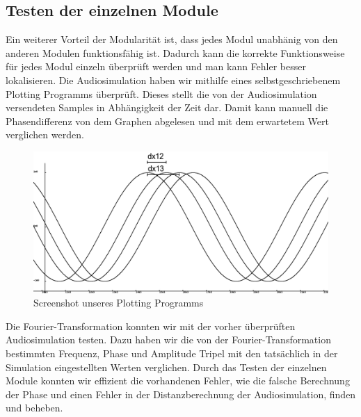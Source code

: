 \subsection{Testen der einzelnen Module}
Ein weiterer Vorteil der Modularität ist, dass jedes Modul unabhänig von den anderen Modulen funktionsfähig ist. Dadurch kann die korrekte Funktionsweise für jedes Modul einzeln überprüft werden und man kann Fehler besser lokalisieren.
Die Audiosimulation haben wir mithilfe eines selbstgeschriebenem Plotting Programms überprüft. Dieses stellt die von der Audiosimulation versendeten Samples in Abhängigkeit der Zeit dar. Damit kann manuell die Phasendifferenz von dem Graphen abgelesen und mit dem erwartetem Wert verglichen werden.
\begin{figure} [H]
  \includegraphics[width=\linewidth]{img/glplot}
  \caption{Screenshot unseres Plotting Programms}
  \label{fig:glplot}
\end{figure}

Die Fourier-Transformation konnten wir mit der vorher überprüften Audiosimulation testen. Dazu haben wir die von der Fourier-Transformation bestimmten Frequenz, Phase und Amplitude Tripel mit den tatsächlich in der Simulation eingestellten Werten verglichen.
Durch das Testen der einzelnen Module konnten wir effizient die vorhandenen Fehler, wie die falsche Berechnung der Phase und einen Fehler in der Distanzberechnung der Audiosimulation, finden und beheben.
